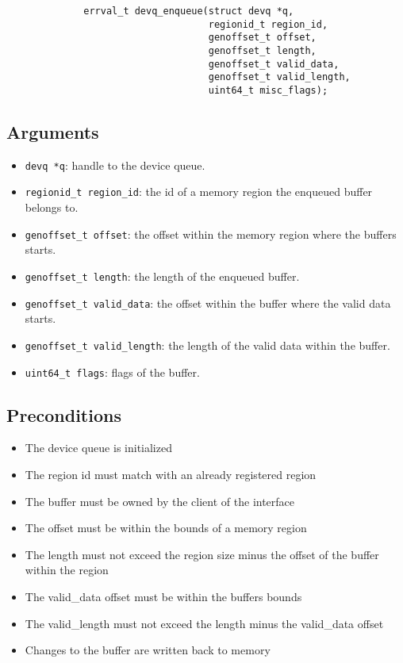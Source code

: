 \documentclass[a4paper,11pt,twoside]{report}
\begin{document}
	
	\begin{figure}[h]
		\begin{lstlisting}
		errval_t devq_enqueue(struct devq *q,
		                      regionid_t region_id,
		                      genoffset_t offset,
		                      genoffset_t length,
		                      genoffset_t valid_data,
		                      genoffset_t valid_length,
		                      uint64_t misc_flags);
		\end{lstlisting}
		\label{lst:enqueue}
	\end{figure}
	
	\subsection*{Arguments}
	\begin{itemize}
		\item \texttt{devq *q}: handle to the device queue.
		\item \texttt{regionid\_t region\_id}: the id of a memory region the enqueued buffer belongs to.
		\item \texttt{genoffset\_t offset}: the offset within the memory region where the buffers starts. 
		\item \texttt{genoffset\_t length}: the length of the enqueued buffer.
		\item \texttt{genoffset\_t valid\_data}: the offset within the buffer where the valid data starts.
		\item \texttt{genoffset\_t valid\_length}: the length of the valid data within the buffer.
		\item \texttt{uint64\_t flags}: flags of the buffer. 
	\end{itemize}
	
	\subsection*{Preconditions}
	\begin{itemize}
		\item The device queue is initialized
		\item The region id must match with an already registered region
		\item The buffer must be owned by the client of the interface 
		\item The offset must be within the bounds of a memory region
		\item The length must not exceed the region size minus the offset of the buffer within the region
		\item The valid\_data offset must be within the buffers bounds
		\item The valid\_length must not exceed the length minus the valid\_data offset
		\item Changes to the buffer are written back to memory
	\end{itemize}
	
\end{document}
